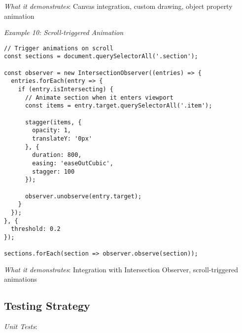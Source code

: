 \documentclass[11pt]{article}
\begin{document}
\emph{What it demonstrates}: Canvas integration, custom drawing, object property animation

\emph{Example 10: Scroll-triggered Animation}

\begin{verbatim}
// Trigger animations on scroll
const sections = document.querySelectorAll('.section');

const observer = new IntersectionObserver((entries) => {
  entries.forEach(entry => {
    if (entry.isIntersecting) {
      // Animate section when it enters viewport
      const items = entry.target.querySelectorAll('.item');
      
      stagger(items, {
        opacity: 1,
        translateY: '0px'
      }, {
        duration: 800,
        easing: 'easeOutCubic',
        stagger: 100
      });
      
      observer.unobserve(entry.target);
    }
  });
}, {
  threshold: 0.2
});

sections.forEach(section => observer.observe(section));
\end{verbatim}

\emph{What it demonstrates}: Integration with Intersection Observer, scroll-triggered animations
\subsection{Testing Strategy}
\label{sec:org6a82c8b}

\emph{Unit Tests}:
\end{document}
